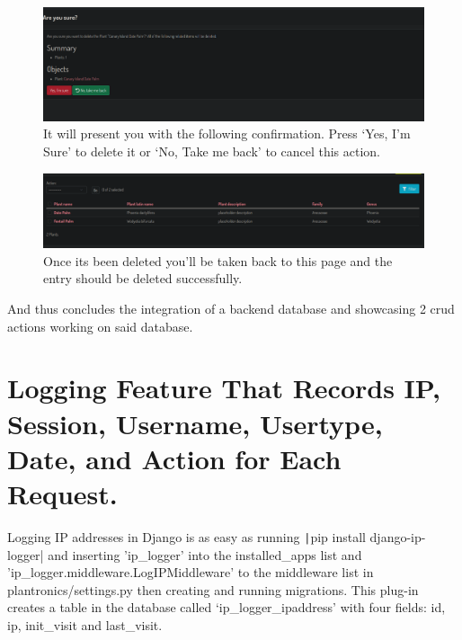 \documentclass{article}
\begin{document}
        \begin{figure}
            \centering
            \caption{It will present you with the following confirmation. Press `Yes, I'm Sure' to delete it or `No, Take me back' to cancel this action.}
            \includegraphics[scale=0.4]{crud6}
        \end{figure}
    
        \begin{figure}
            \centering
            \caption{Once its been deleted you'll be taken back to this page and the entry should be deleted successfully.}
            \includegraphics[scale=0.4]{crud7}
        \end{figure}
    
        And thus concludes the integration of a backend database and showcasing 2 crud actions working on said database.
	
	\section{Logging Feature That Records IP, Session, Username, Usertype, Date, and Action for Each Request.}
 
     Logging IP addresses in Django is as easy as running
     \texttt|pip install django-ip-logger| 
     and inserting 'ip\_logger' into the installed\_apps list and 'ip\_logger.middleware.LogIPMiddleware' to the
     middleware list in plantronics/settings.py then creating
     and running migrations.
     This plug-in creates a table in the database
     called `ip\_logger\_ipaddress' with four fields: id, ip, init\_visit and last\_visit.  
        
\end{document}
